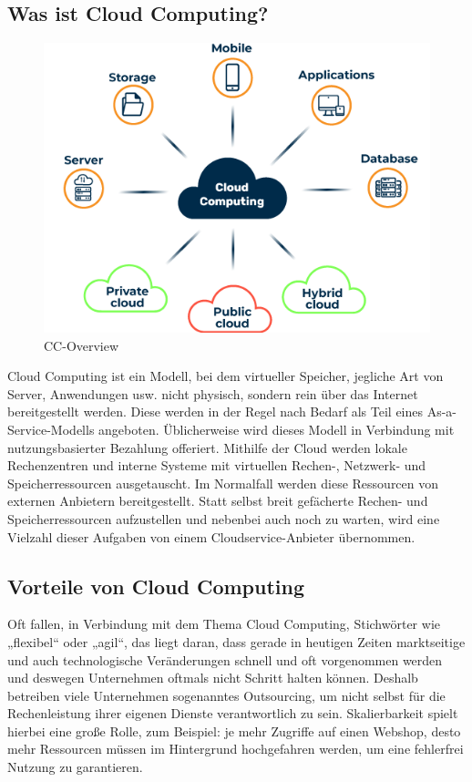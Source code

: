\subsection{Was ist Cloud Computing?}

\begin{figure}[h]
    \centering
    \includegraphics[scale=0.9]{sections/cloud-computing/images/cc.png}
    \caption{CC-Overview}
    \label{fig:kimldl-comparison}
\end{figure}

Cloud Computing ist ein Modell, bei dem virtueller Speicher, jegliche Art von Server, Anwendungen usw. nicht physisch, sondern rein über das Internet bereitgestellt werden. Diese werden in der Regel nach Bedarf als Teil eines As-a-Service-Modells angeboten. Üblicherweise wird dieses Modell in Verbindung mit nutzungsbasierter Bezahlung offeriert. Mithilfe der Cloud werden lokale Rechenzentren und interne Systeme mit virtuellen Rechen-, Netzwerk- und Speicherressourcen ausgetauscht. Im Normalfall werden diese Ressourcen von externen Anbietern bereitgestellt. Statt selbst breit gefächerte Rechen- und Speicherressourcen aufzustellen und nebenbei auch noch zu warten, wird eine Vielzahl dieser Aufgaben von einem Cloudservice-Anbieter übernommen.

\subsection{Vorteile von Cloud Computing}

Oft fallen, in Verbindung mit dem Thema Cloud Computing, Stichwörter wie „flexibel“ oder „agil“, das liegt daran, dass gerade in heutigen Zeiten marktseitige und auch technologische Veränderungen schnell und oft vorgenommen werden und deswegen Unternehmen oftmals nicht Schritt halten können. Deshalb betreiben viele Unternehmen sogenanntes Outsourcing, um nicht selbst für die Rechenleistung ihrer eigenen Dienste verantwortlich zu sein. Skalierbarkeit spielt hierbei eine große Rolle, zum Beispiel: je mehr Zugriffe auf einen Webshop, desto mehr Ressourcen müssen im Hintergrund hochgefahren werden, um eine fehlerfrei Nutzung zu garantieren.

